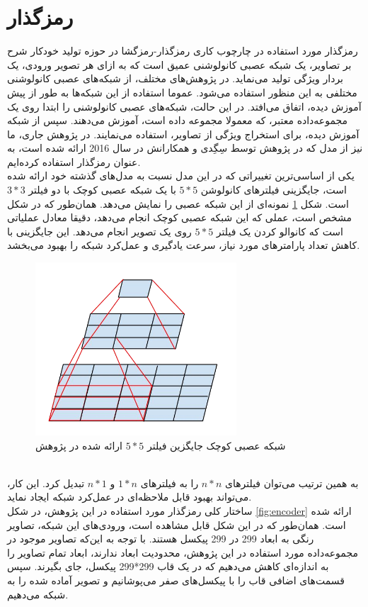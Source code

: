 \section{رمزگذار}
رمزگذار مورد استفاده در چارچوب کاری رمزگذار-رمزگشا در حوزه تولید خودکار شرح بر تصاویر، یک شبکه عصبی کانولوشنی عمیق است که به‌ ازای هر تصویر ورودی،‌ یک بردار ویژگی تولید می‌نماید. در پژوهش‌های مختلف، از شبکه‌های عصبی کانولوشنی مختلفی به این منظور استفاده می‌شود. عموما استفاده از این شبکه‌ها به طور از پیش آموزش دیده، اتفاق می‌افتد. در این حالت، شبکه‌های عصبی کانولوشنی را ابتدا روی یک مجموعه‌داده معتبر، که معمولا مجموعه داده  است، آموزش می‌دهند. سپس از شبکه آموزش دیده، برای استخراج ویژگی از تصاویر، استفاده می‌نمایند. در پژوهش جاری، ما نیز از مدل  که در پژوهش \cite{szegedy2016rethinking} توسط سِگِدی و همکارانش در سال 2016 ارائه شده است، به عنوان رمزگذار استفاده کرده‌ایم.
\\
یکی از اساسی‌ترین تغییراتی که در این مدل نسبت به مدل‌های گذشته خود ارائه شده است، جایگزینی فیلترهای کانولوشن $5*5$ با یک شبکه عصبی کوچک با دو فیلتر $3*3$ است. شکل \ref{fig:conv53} نمونه‌ای از این شبکه عصبی را نمایش می‌دهد. همان‌طور که در شکل مشخص است، عملی که این شبکه عصبی کوچک انجام می‌دهد، دقیقا معادل عملیاتی است که کانوالو کردن یک فیلتر $5*5$ روی یک تصویر انجام می‌دهد. این جایگزینی با کاهش تعداد پارامترهای مورد نیاز، سرعت یادگیری و عمل‌کرد شبکه را بهبود می‌بخشد. 
\begin{figure}[h]
	\centering
	\includegraphics[scale=0.5]{Imgs/inceptionConv53.png}
	\caption[شبکه عصبی کوچک جایگزین فیلتر $5*5$]{شبکه‌ عصبی کوچک جایگزین فیلتر $5*5$ ارائه شده در پژوهش \cite{szegedy2016rethinking}}
	\label{fig:conv53}
\end{figure}
\\
به همین ترتیب می‌توان فیلتر‌های $n*n$‌ را به فیلتر‌های $1*n$ و $n*1$ تبدیل کرد. این کار، می‌تواند بهبود قابل ملاحظه‌ای در عمل‌کرد شبکه ایجاد نماید.
\\
ساختار کلی رمزگذار مورد استفاده در این پژوهش، در شکل \ref{fig:encoder} ارائه شده است. همان‌طور که در این شکل قابل مشاهده است، ورودی‌های این شبکه، تصاویر رنگی به ابعاد 299 در 299 پیکسل هستند. با توجه به این‌که تصاویر موجود در مجموعه‌داده مورد استفاده در این پژوهش، محدودیت ابعاد ندارند، ابعاد تمام تصاویر را به اندازه‌ای کاهش می‌دهیم که در یک قاب 299*299 پیکسل، جای بگیرند. سپس قسمت‌های اضافی قاب را با پیکسل‌های صفر می‌پوشانیم و تصویر آماده شده را به شبکه می‌دهیم.

